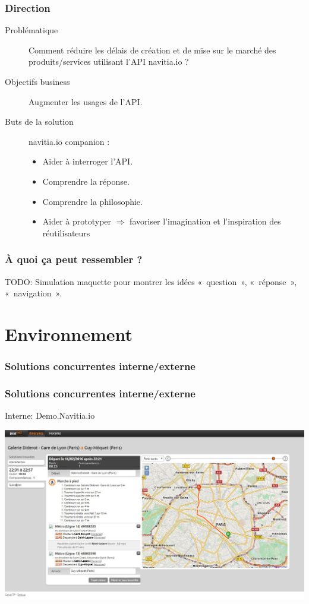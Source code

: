 \documentclass[table]{beamer}
\begin{document}
\begin{frame}
  \frametitle{Direction}

  \begin{description}
  \item[Problématique] Comment réduire les délais de création et de
    mise sur le marché des produits/services utilisant l'API
    navitia.io ?
  \item[Objectifs business] Augmenter les usages de l'API.
  \item[Buts de la solution] navitia.io companion :
    \begin{itemize}
    \item Aider à interroger l'API.
    \item Comprendre la réponse.
    \item Comprendre la philosophie.
    \item Aider à prototyper $\Rightarrow$ favoriser l'imagination et
      l'inspiration des réutilisateurs
    \end{itemize}
  \end{description}
\end{frame}

\begin{frame}
  \frametitle{À quoi ça peut ressembler ?}

  TODO: Simulation maquette pour montrer les idées «~question~»,
  «~réponse~», «~navigation~».
\end{frame}

\section{Environnement}

\begin{frame}
  \frametitle{Solutions concurrentes interne/externe}

\end{frame}

\begin{frame}
  \frametitle{Solutions concurrentes interne/externe}
  \begin{description}
    \item[Interne: Demo.Navitia.io]
  \end{description}
  \centering\includegraphics[width=\linewidth]{images/demo_navitia_io}
\end{frame}
\end{document}
